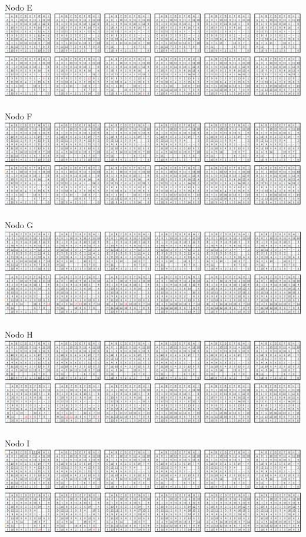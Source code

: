 \documentclass[paper=a4, fontsize=11pt]{scrartcl}
\numberwithin{equation}{section}		%
\numberwithin{figure}{section}			%
\numberwithin{table}{section}				%
\begin{document}
Nodo E
\includegraphics[width=1\textwidth]{3e1.png}\\
\includegraphics[width=1\textwidth]{3e2.png}\\\\
Nodo F
\includegraphics[width=1\textwidth]{3f1.png}\\
\includegraphics[width=1\textwidth]{3f2.png}\\\\
Nodo G
\includegraphics[width=1\textwidth]{3g1.png}\\
\includegraphics[width=1\textwidth]{3g2.png}\\\\
Nodo H
\includegraphics[width=1\textwidth]{3h1.png}\\
\includegraphics[width=1\textwidth]{3h2.png}\\\\
Nodo I
\includegraphics[width=1\textwidth]{3i1.png}\\
\includegraphics[width=1\textwidth]{3i2.png}\\\\
\end{document}
